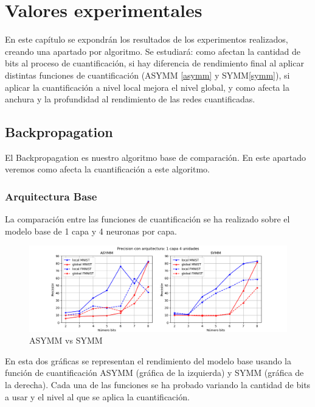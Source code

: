 \chapter{Valores experimentales} \label{implementacion}
En este capítulo se expondrán los resultados de los experimentos realizados, creando una apartado por algoritmo. Se estudiará: como afectan la cantidad de bits al proceso de cuantificación, si hay diferencia de rendimiento final al aplicar distintas funciones de cuantificación (ASYMM \ref{asymm} y SYMM\ref{symm}), si aplicar la cuantificación a nivel local mejora el nivel global, y como afecta la anchura y la profundidad al rendimiento de las redes cuantificadas.

\newpage

\section{Backpropagation}
El Backpropagation es nuestro algoritmo base de comparación. En este apartado veremos como afecta la cuantificación a este algoritmo.

\subsection{Arquitectura Base}

La comparación entre las funciones de cuantificación se ha realizado sobre el modelo base de 1 capa y 4 neuronas por capa.

\begin{figure}[H]
    \centering
    \includegraphics[width=\textwidth]{imagenes/backprop/Precision con arquitectura: 1 capa 4 unidades.png}
    \caption{ASYMM vs SYMM}
    \label{fig:asymmvssymm}
\end{figure}

En esta dos gráficas se representan el rendimiento del modelo base usando la función de cuantificación ASYMM (gráfica de la izquierda) y SYMM (gráfica de la derecha). Cada una de las funciones se ha probado variando la cantidad de bits a usar y el nivel al que se aplica la cuantificación.  

